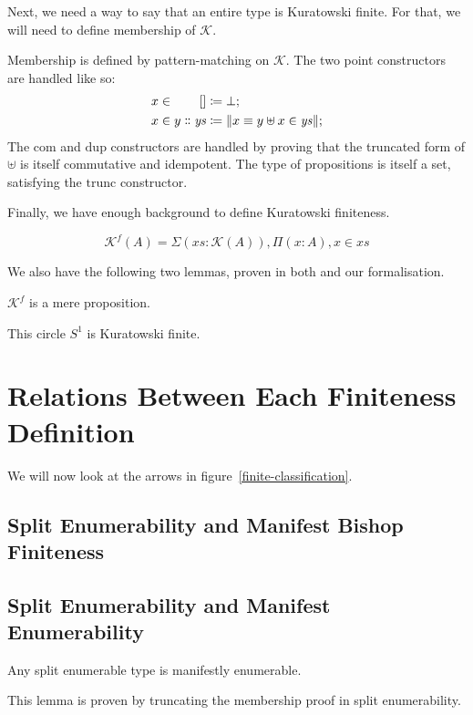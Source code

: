 Next, we need a way to say that an entire type is Kuratowski finite.
For that, we will need to define membership of \(\mathcal{K}\).
\begin{definition}
  Membership is defined by pattern-matching on \(\mathcal{K}\).
  The two point constructors are handled like so:
  \begin{equation}
    \begin{alignedat}{2}
      x \in&& \; []                      &\coloneqq \bot ; \\
      x \in&& \; y \dblcolon \mathit{ys} &\coloneqq \lVert x \equiv y \uplus x \in \mathit{ys} \rVert ;
    \end{alignedat}
  \end{equation}
  The \(\text{com}\) and \(\text{dup}\) constructors are handled by proving that
  the truncated form of \(\uplus\) is itself commutative and idempotent.
  The type of propositions is itself a set, satisfying the \(\text{trunc}\)
  constructor.
\end{definition}
Finally, we have enough background to define Kuratowski finiteness.
\begin{definition}
  \begin{equation}
    \mathcal{K}^{f}(A) = \Sigma {(\mathit{xs} : \mathcal{K}(A))} , \Pi (x : A) , x \in \mathit{xs}
  \end{equation}
\end{definition}

We also have the following two lemmas, proven in both
\cite{fruminFiniteSetsHomotopy2018} and our formalisation.
\begin{lemma}
  \(\mathcal{K}^f\) is a mere proposition.
\end{lemma}
\begin{lemma}
  This circle \(S^1\) is Kuratowski finite.
\end{lemma}
\section{Relations Between Each Finiteness Definition} \label{relations}
We will now look at the arrows in figure~\ref{finite-classification}.
\subsection{Split Enumerability and Manifest Bishop Finiteness}
\subsection{Split Enumerability and Manifest Enumerability}
\begin{lemma} \label{split-enum-to-manifest-enum}
  Any split enumerable type is manifestly enumerable.
\end{lemma}
This lemma is proven by truncating the membership proof in split enumerability.

